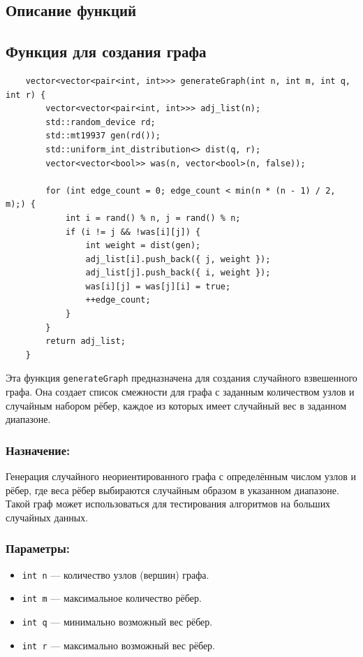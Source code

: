 \subsection{Описание функций}

\subsection*{Функция для создания графа}

\begin{verbatim}
    vector<vector<pair<int, int>>> generateGraph(int n, int m, int q, int r) {
        vector<vector<pair<int, int>>> adj_list(n);
        std::random_device rd;
        std::mt19937 gen(rd());
        std::uniform_int_distribution<> dist(q, r);
        vector<vector<bool>> was(n, vector<bool>(n, false));
    
        for (int edge_count = 0; edge_count < min(n * (n - 1) / 2, m);) {
            int i = rand() % n, j = rand() % n;
            if (i != j && !was[i][j]) {
                int weight = dist(gen);
                adj_list[i].push_back({ j, weight });
                adj_list[j].push_back({ i, weight });
                was[i][j] = was[j][i] = true;
                ++edge_count;
            }
        }
        return adj_list;
    }
    \end{verbatim}

Эта функция \texttt{generateGraph} предназначена для создания случайного взвешенного графа. Она создает список смежности для графа с заданным количеством узлов и случайным набором рёбер, каждое из которых имеет случайный вес в заданном диапазоне.

\subsubsection*{Назначение:}
Генерация случайного неориентированного графа с определённым числом узлов и рёбер, где веса рёбер выбираются случайным образом в указанном диапазоне. Такой граф может использоваться для тестирования алгоритмов на больших случайных данных.

\subsubsection*{Параметры:}
\begin{itemize}
    \item \texttt{int n} — количество узлов (вершин) графа.
    \item \texttt{int m} — максимальное количество рёбер.
    \item \texttt{int q} — минимально возможный вес рёбер.
    \item \texttt{int r} — максимально возможный вес рёбер.
\end{itemize}

